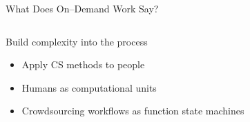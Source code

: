 \documentclass[presentation]{subfiles}
\begin{document}
\begin{frame}{What Does On--Demand Work Say?}
  \begin{columns}
    \begin{column}{0.5\textwidth}
      Build complexity into the process
      \begin{itemize}
        \item<+-> Apply CS methods to people\par
                 \scriptsize{\textcite{crowdForgeKittur}\par}\normalsize{}
        \item<+-> Humans as computational units\par
                 \scriptsize{\textcite{Lasecki:2014:LSR:2661334.2661352}\par}\normalsize{}
        \item<+-> Crowdsourcing workflows as function state machines\par
                 \scriptsize{\textcite{latoza2014microtask}\par}\normalsize{}
      \end{itemize}
    \end{column}
    
    \begin{column}{0.5\textwidth}
      

\end{column}
\end{columns}
\end{frame}
\end{document}
